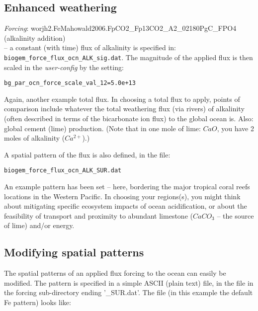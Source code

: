 \documentclass[11pt,fleqn]{book} %
\begin{document}
\subsection{Enhanced weathering}

\vspace{2mm}
\textit{Forcing}: \textsf{\footnotesize worjh2.FeMahowald2006.FpCO2\_Fp13CO2\_A2\_02180PgC\_FPO4} (alkalinity addition)
\vspace{1mm}
\\ -- a constant (with time) flux of alkalinity is specified in: \texttt{biogem\_force\_flux\_ocn\_ALK\_sig.dat}. The magnitude of the applied flux is then scaled in the \textit{user-config} by the setting:
\vspace{-2mm}\small\begin{verbatim}
bg_par_ocn_force_scale_val_12=5.0e+13
\end{verbatim}\normalsize\vspace{-2mm}

Again, another example total flux. In choosing a total flux to apply, points of comparison include whatever the total weathering flux (via rivers) of alkalinity (often described in terms of the bicarbonate ion flux) to the global ocean is. Also: global cement (lime) production. (Note that in one mole of lime: \(CaO\), you have 2 moles of alkalinity (\(Ca^{2+}\)).)

\vspace{1mm}
A spatial pattern of the flux is also defined, in the file:
\vspace{-2mm}\small\begin{verbatim}
biogem_force_flux_ocn_ALK_SUR.dat
\end{verbatim}\normalsize\vspace{-2mm}

An example pattern has been set – here, bordering the major tropical coral reefs locations in the Western Pacific. In choosing your regions(s), you might think about mitigating specific ecosystem impacts of ocean acidification, or about the feasibility of transport and proximity to abundant limestone (\(CaCO_{3}\) – the source of lime) and/or energy.


\subsection{Modifying spatial patterns}

\vspace{2mm}
The spatial patterns of an applied flux forcing to the ocean can easily be modified. The pattern is specified in a simple ASCII (plain text) file, in the file in the forcing sub-directory ending '\textsf{\footnotesize \_SUR.dat}'. The file (in this example the default Fe pattern) looks like:
\end{document}
